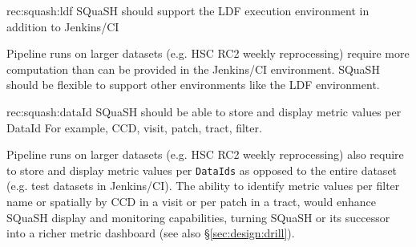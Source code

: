 \begin{recommendation}
    {rec:squash:ldf}
    {SQuaSH should support the LDF execution environment in addition to Jenkins/CI}
\end{recommendation}

Pipeline runs on larger datasets (e.g. HSC RC2 weekly reprocessing) require more computation than can be provided in the Jenkins/CI environment. SQuaSH should be flexible to support other environments like the LDF environment.

\begin{recommendation}
    {rec:squash:dataId}
    {SQuaSH should be able to store and display metric values per DataId}
For example, CCD, visit, patch, tract, filter.
\end{recommendation}

Pipeline runs on larger datasets (e.g. HSC RC2 weekly reprocessing) also require to store and display metric values per \texttt{DataIds} as opposed to the entire dataset (e.g. test datasets in Jenkins/CI). The ability to identify metric values per filter name or spatially by CCD in a visit or per patch in a tract, would enhance SQuaSH display and monitoring capabilities, turning SQuaSH or its successor into a richer metric dashboard (see also \S\ref{sec:design:drill}).
